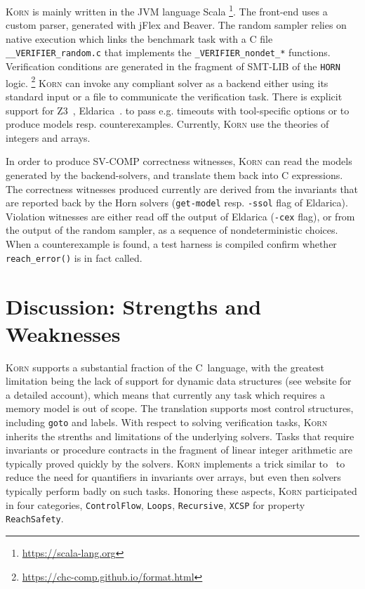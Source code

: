 \documentclass{llncs}
\newcommand{\Korn}{\textsc{Korn}\xspace}
\begin{document}
\Korn is mainly written in the JVM language Scala
    \footnote{\url{https://scala-lang.org}}.
The front-end uses a custom parser, generated with jFlex and Beaver.
The random sampler relies on native execution which links
the benchmark task with a C file \verb!__VERIFIER_random.c!
that implements the \verb!_VERIFIER_nondet_*! functions.
Verification conditions are generated in the fragment of SMT-LIB of the \texttt{HORN} logic.%
    \footnote{\url{https://chc-comp.github.io/format.html}}
\Korn can invoke any compliant solver as a backend either using its standard input or a file to communicate the verification task.
There is explicit support for Z3~\cite{gurfinkel2019science}, Eldarica~\cite{hojjat2018eldarica}.%
to pass e.g. timeouts with tool-specific options or to produce models resp. counterexamples.
Currently, \Korn use the theories of integers and arrays.

In order to produce SV-COMP correctness witnesses, \Korn can read the models generated by the backend-solvers, and translate them back into C expressions.
The correctness witnesses produced currently are derived from
the invariants that are reported back by the Horn solvers (\texttt{get-model} resp. \texttt{-ssol} flag of Eldarica).
Violation witnesses are either read off the output of Eldarica (\texttt{-cex} flag),
or from the output of the random sampler, as a sequence of nondeterministic choices.
When a counterexample is found, a test harness is compiled confirm whether \texttt{reach\_error()} is in fact called.

\section{Discussion: Strengths and Weaknesses}
\label{sec:discussion}

\Korn supports a substantial fraction of the C~language, with the greatest limitation
being the lack of support for dynamic data structures (see website for a detailed account),
which means that currently any task which requires a memory model is out of scope.
The translation supports most control structures, including \texttt{goto} and labels.
With respect to solving verification tasks,
\Korn inherits the strenths and limitations of the underlying solvers.
Tasks that require invariants or procedure contracts in the fragment of linear integer arithmetic
are typically proved quickly by the solvers.
\Korn implements a trick similar to~\cite{monniaux2016cell}
to reduce the need for quantifiers in invariants over arrays,
but even then solvers typically perform badly on such tasks.
Honoring these aspects, \Korn participated in four categories,
\texttt{ControlFlow},
\texttt{Loops},
\texttt{Recursive},
\texttt{XCSP}
for property \texttt{ReachSafety}.
\end{document}
